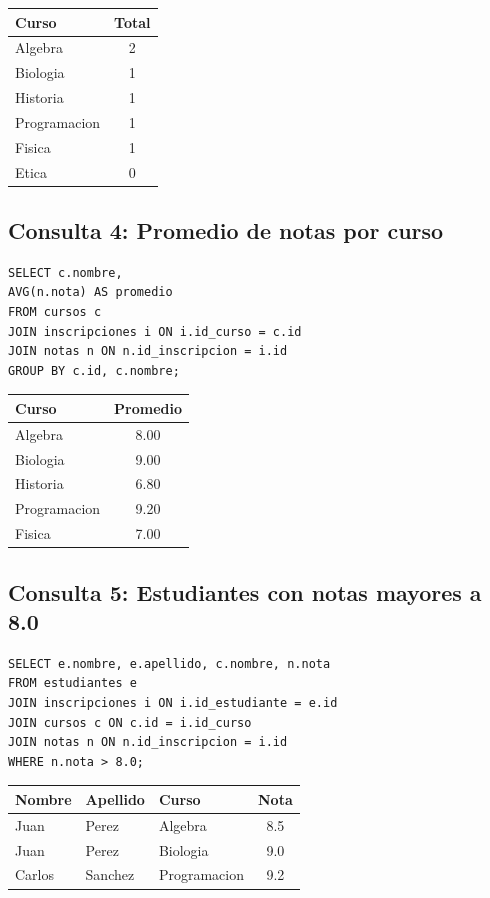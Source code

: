 \documentclass[12pt,a4paper]{article}
\begin{document}
\begin{center}
\begin{tabular}{|l|c|}
\hline
Curso & Total \\
\hline
Algebra & 2 \\
Biologia & 1 \\
Historia & 1 \\
Programacion & 1 \\
Fisica & 1 \\
Etica & 0 \\
\hline
\end{tabular}
\end{center}

\subsection{Consulta 4: Promedio de notas por curso}

\begin{lstlisting}
SELECT c.nombre,
AVG(n.nota) AS promedio
FROM cursos c
JOIN inscripciones i ON i.id_curso = c.id
JOIN notas n ON n.id_inscripcion = i.id
GROUP BY c.id, c.nombre;
\end{lstlisting}

\begin{center}
\begin{tabular}{|l|c|}
\hline
Curso & Promedio \\
\hline
Algebra & 8.00 \\
Biologia & 9.00 \\
Historia & 6.80 \\
Programacion & 9.20 \\
Fisica & 7.00 \\
\hline
\end{tabular}
\end{center}

\subsection{Consulta 5: Estudiantes con notas mayores a 8.0}

\begin{lstlisting}
SELECT e.nombre, e.apellido, c.nombre, n.nota
FROM estudiantes e
JOIN inscripciones i ON i.id_estudiante = e.id
JOIN cursos c ON c.id = i.id_curso
JOIN notas n ON n.id_inscripcion = i.id
WHERE n.nota > 8.0;
\end{lstlisting}

\begin{center}
\begin{tabular}{|l|l|l|c|}
\hline
Nombre & Apellido & Curso & Nota \\
\hline
Juan & Perez & Algebra & 8.5 \\
Juan & Perez & Biologia & 9.0 \\
Carlos & Sanchez & Programacion & 9.2 \\
\hline
\end{tabular}
\end{center}
\end{document}
